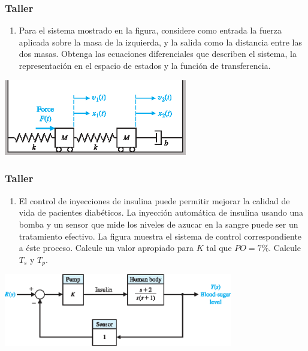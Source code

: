 \documentclass[aspectratio=169,handout]{beamer}
\theoremstyle{definition}
\theoremstyle{plain}
\theoremstyle{remark}
\newcounter{saveenumi}
\newcommand{\seti}{\setcounter{saveenumi}{\value{enumi}}}
\newcommand{\conti}{\setcounter{enumi}{\value{saveenumi}}}
\begin{document}
\begin{frame}[c]\frametitle{Taller}
\begin{enumerate}
  \item Para el sistema mostrado en la figura, considere como entrada la fuerza aplicada sobre la masa de la izquierda, y la salida como la distancia entre las dos masas. Obtenga las ecuaciones diferenciales que describen el sistema, la representación en el espacio de estados y la función de transferencia.
  \seti
\end{enumerate}
\begin{center}
  \includegraphics[width=8cm]{images/twoMassSystem.eps}
\end{center}
\end{frame}

\begin{frame}[c]\frametitle{Taller}
\begin{enumerate}
  \conti
  \item El control de inyecciones de insulina puede permitir mejorar la calidad de vida de pacientes diabéticos. La inyección automática de insulina usando una bomba y un sensor que mide los niveles de azucar en la sangre puede ser un tratamiento efectivo. La figura muestra el sistema de control correspondiente a éste proceso. Calcule un valor apropiado para $K$ tal que $PO = 7\%$. Calcule $T_s$ y $T_p$.
  \seti
\end{enumerate}
\begin{center}
  \includegraphics[width=10cm]{images/insulin.eps}
\end{center}
\end{frame}
\end{document}
